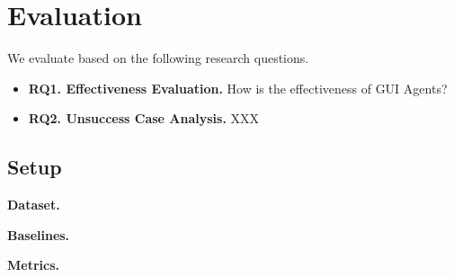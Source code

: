 
\section{Evaluation}

We evaluate \tool based on the following research questions.



\begin{itemize}[leftmargin=*]
  \item \textbf{RQ1. Effectiveness Evaluation.} How is the effectiveness of GUI Agents?
  \item \textbf{RQ2. Unsuccess Case Analysis.} XXX
\end{itemize}


\subsection{Setup}

\textbf{Dataset.}

\textbf{Baselines.} 

\textbf{Metrics.}


